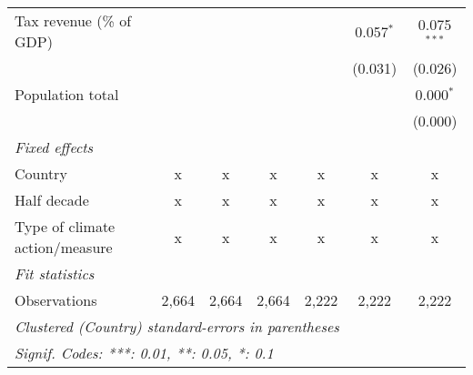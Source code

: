 \begin{tabular}{lcccccc}
   Tax revenue (\% of GDP)                                 &               &                &                &                & 0.057$^{*}$    & 0.075$^{***}$\\   
                                                           &               &                &                &                & (0.031)        & (0.026)\\   
   Population total                                        &               &                &                &                &                & 0.000$^{*}$\\   
                                                           &               &                &                &                &                & (0.000)\\   
   \emph{Fixed effects}\\
   Country                                                 & x             & x              & x              & x              & x              & x\\  
   Half decade                                             & x             & x              & x              & x              & x              & x\\  
   Type of climate action/measure                          & x             & x              & x              & x              & x              & x\\  
   \midrule \emph{Fit statistics}\\
   Observations                                            & 2,664         & 2,664          & 2,664          & 2,222          & 2,222          & 2,222\\  
   \midrule
   \multicolumn{7}{l}{\emph{Clustered (Country) standard-errors in parentheses}}\\
   \multicolumn{7}{l}{\emph{Signif. Codes: ***: 0.01, **: 0.05, *: 0.1}}\\
\end{tabular}
\par\endgroup


